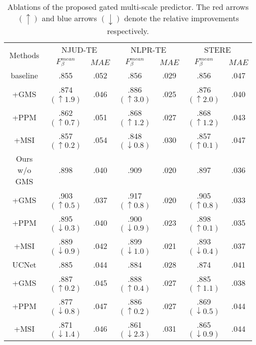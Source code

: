 \documentclass[journal]{IEEEtran}
\begin{document}
\linespread{1.3}
\begin{table}[]
\caption{Ablations of the proposed gated multi-scale predictor. The red arrows {\color{red}$(\uparrow)$} and blue arrows {\color{blue}$(\downarrow)$} denote the relative improvements respectively. }
\label{table: GMS generalization}
\begin{center}
\renewcommand\tabcolsep{1.0pt}
\begin{tabular}{c|cc|cc|cc}
\hline
\multirow{2}{*}{Methods} & \multicolumn{2}{c|}{NJUD-TE} & \multicolumn{2}{c|}{NLPR-TE} & \multicolumn{2}{c}{STERE} \\
      & $F^{mean}_\beta$ & $MAE$ & $F^{mean}_\beta$ & $MAE$ & $F^{mean}_\beta$ & $MAE$ \\ \hline
baseline & .855 & .052 & .856 & .029 & .856 & .047  \\
+GMS  & .874{\color{red}$(\uparrow1.9)$} & .046 & .886{\color{red}$(\uparrow3.0)$} & .025 & .876{\color{red}$(\uparrow2.0)$} & .040  \\
+PPM  & .862{\color{red}$(\uparrow0.7)$} & .051 & .868{\color{red}$(\uparrow1.2)$} & .027 & .868{\color{red}$(\uparrow1.2)$} & .043  \\
+MSI  & .857{\color{red}$(\uparrow0.2)$} & .054 & .848{\color{blue}$(\downarrow0.8)$} & .030 & .857{\color{red}$(\uparrow0.1)$} & .047  \\ \hline
Ours w/o GMS  & .898 & .040 & .909 & .020 & .897 & .036  \\
+GMS  & .903{\color{red}$(\uparrow0.5)$} & .037 & .917{\color{red}$(\uparrow0.8)$} & .020 & .905{\color{red}$(\uparrow0.8)$} & .033 \\
+PPM  & .895{\color{blue}$(\downarrow0.3)$} & .040 & .900{\color{blue}$(\downarrow0.9)$} & .023 & .898{\color{red}$(\uparrow0.1)$} & .035  \\
+MSI  & .889{\color{blue}$(\downarrow0.9)$} & .042 & .899{\color{blue}$(\downarrow1.0)$} & .021 & .893{\color{blue}$(\downarrow0.4)$} & .037 \\ \hline
UCNet \cite{zhang2020uc} & .885 & .044 & .884 & .028 & .874 & .041 \\
+GMS  & .887{\color{red}$(\uparrow0.2)$}  & .045 & .888{\color{red}$(\uparrow0.4)$} & .027 & .885{\color{red}$(\uparrow1.1)$} & .038 \\
+PPM  & .877{\color{blue}$(\downarrow0.8)$} & .047 & .886{\color{red}$(\uparrow0.2)$} & .027 & .869{\color{blue}$(\downarrow0.5)$} & .044 \\
+MSI  & .871{\color{blue}$(\downarrow1.4)$}  & .046 & .861{\color{blue}$(\downarrow2.3)$} & .031 & .865{\color{blue}$(\downarrow0.9)$} & .044 \\ \hline
\end{tabular}
\end{center}
\end{table}
\linespread{1}
\end{document}
